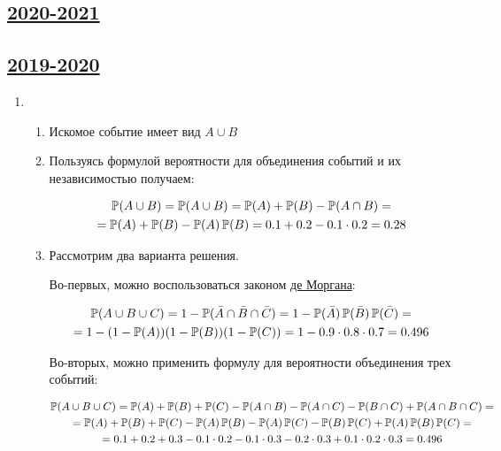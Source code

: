\subsection[2020-2021]{\hyperref[sec:kr_01_2020_2021]{2020-2021}}
\label{sec:sol_kr_01_2020_2021}



\subsection[2019-2020]{\hyperref[sec:kr_01_2019_2020]{2019-2020}}
\label{sec:sol_kr_01_2019_2020}

\begin{enumerate}
	
	\item  
	\begin{enumerate}
	\item Искомое событие имеет вид $A\cup B$
	\item Пользуясь формулой вероятности для объединения событий и их независимостью получаем:
	
	\begin{multline*}
	\P(A\cup B)=\P(A\cup B)=\P(A)+\P(B)-\P(A\cap B)=\\
	=\P(A)+\P(B)-\P(A)\P(B)=0.1+0.2-0.1\cdot 0.2=0.28
	\end{multline*}
	\item Рассмотрим два варианта решения.
	
	Во-первых, можно воспользоваться законом \href{https://en.wikipedia.org/wiki/Augustus_De_Morgan}{де Моргана}:
	
	\begin{multline*}
	\P(A\cup B\cup C)=1-\P(\bar{A}\cap \bar{B}\cap \bar{C})=1-\P(\bar{A})\P(\bar{B})\P(\bar{C})= \\
	=1-(1-\P(A))(1-\P(B))(1-\P(C))=1-0.9\cdot 0.8 \cdot 0.7=0.496
	\end{multline*}
	
	Во-вторых, можно применить формулу для вероятности объединения трех событий:
	
	\begin{multline*}
	\P(A\cup B\cup C)=\P(A)+\P(B)+\P(C)-\P(A\cap B)-\P(A\cap C)-\P(B\cap C)+\P(A\cap B\cap C)=\\
	=\P(A)+\P(B)+\P(C)-\P(A)\P(B)-\P(A)\P(C)-\P(B)\P(C)+\P(A)\P(B)\P(C)=\\
	=0.1+0.2+0.3-0.1\cdot 0.2-0.1\cdot 0.3-0.2\cdot 0.3+0.1\cdot 0.2\cdot 0.3=0.496
	\end{multline*}
	

\end{enumerate}
\end{enumerate}
